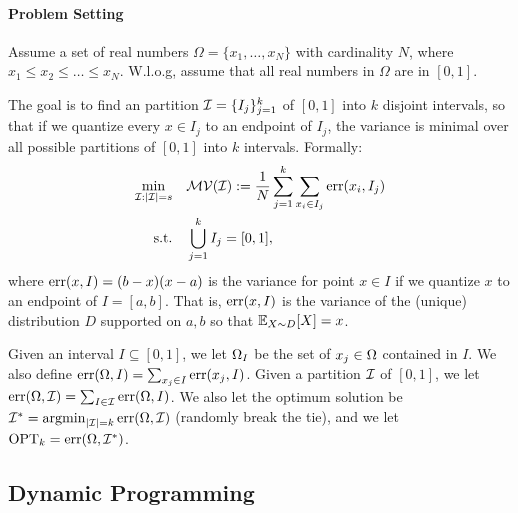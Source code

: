 
\vspace{-0.5em}
\paragraph*{Problem Setting}
Assume a set of real numbers $\Omega = \{x_1, \ldots, x_N\}$ 
with cardinality $N$, where $x_1 \leq x_2 \leq \ldots \leq x_N$.
W.l.o.g, assume 
that all real numbers in $\Omega$ are 
in $[0, 1]$. 

The goal is to find an partition $\mathcal{I} = \{I_j\}_{j = 1}^k$ of $[0, 1]$ into $k$ disjoint intervals, so that if we quantize every $x \in I_j$ to an endpoint of $I_j$, the variance is minimal over all possible partitions of $[0, 1]$ into $k$ intervals.
Formally:
\begin{align}
\nonumber \min_{\mathcal{I}: |\mathcal{I}| = s} \quad & \mathcal{MV}(\mathcal{I}) := {1\over N}\sum_{j = 1}^k \sum_{x_i \in I_j} \mathrm{err}(x_i, I_j)\\
\text{s.t.}\quad & \bigcup_{j = 1}^k I_j = [0, 1],
\label{eq:opt_Q}
\end{align}
where $\mathrm{err} (x, I) = (b - x) (x - a)$ is the variance for point $x \in I$ if we quantize $x$ to an endpoint of $I = [a, b]$.
That is, $\mathrm{err} (x, I)$ is the variance of the (unique) distribution $D$ supported on ${a, b}$  so that $\mathbb{E}_{X \sim D} [X] = x$.


Given an interval $I \subseteq [0, 1]$, we let $\Omega_I$ be the set of $x_j \in \Omega$ contained in $I$.
We also define $\mathrm{err} (\Omega, I) = \sum_{x_j \in I} \mathrm{err} (x_j, I)$.
Given a partition $\mathcal{I}$ of $[0, 1]$, we let $\mathrm{err} (\Omega, \mathcal{I}) = \sum_{I \in \mathcal{I}} \mathrm{err} (\Omega, I)$.
We also let the optimum solution be $\mathcal{I}^* = \operatorname*{argmin}_{|\mathcal{I}| = k} \mathrm{err} (\Omega, \mathcal{I})$ (randomly break the tie), and we let $\mathrm{OPT}_k = \mathrm{err}(\Omega, \mathcal{I}^*)$.


\vspace{-0.5em}
\subsection{Dynamic Programming}
\vspace{-0.5em}

